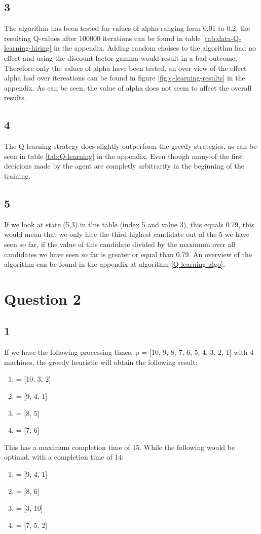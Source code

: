 \documentclass{article}
\begin{document}
\subsection*{3}
The algorithm has been tested for values of alpha ranging form 0.01 to 0.2, the resulting Q-values after 100000 iterations can be found in table \ref{tab:data-Q-learning-hiring} in the appendix. Adding random choises to the algorithm had no effect and using the discount factor gamma would result in a bad outcome. Therefore only the values of alpha have been tested, an over view of the effect alpha had over itereations can be found in figure \ref{fig:q-learning-results} in the appendix. As can be seen, the value of alpha does not seem to affect the overall results. 
\subsection*{4}
 The Q-learning strategy does slightly outperform the greedy strategies, as can be seen in table \ref{tab:Q-learning} in the appendix. Even though many of the first decicions made by the agent are completly arbitrarity in the beginning of the training.  
\subsection*{5}
If we look at state (5,3) in this table (index 5 and value 3), this equals 0.79, this would mean that we only hire the third highest candidate out of the 5 we have seen so far, if the value of this candidate divided by the maximum over all candidates we have seen so far is greater or equal than 0.79. An overview of the algorithm can be found in the appendix at algorithm \ref{Q-learning algo}. 
\section*{Question 2}
\subsection*{1}
If we have the following processing times: p = [10, 9, 8, 7, 6, 5, 4, 3, 2, 1] with 4 machines, the greedy heuristic will obtain the following result:  
\begin{enumerate}
	\item = [10, 3, 2]
	\item = [9, 4, 1]
	\item = [8, 5]
	\item = [7, 6] 
\end{enumerate}
This has a maximum completion time of 15. While the following would be optimal, with a completion time of 14:
\begin{enumerate}
	\item = [9, 4, 1]
	\item = [8, 6]
	\item = [3, 10]
	\item = [7, 5, 2] 
\end{enumerate}
\end{document}
